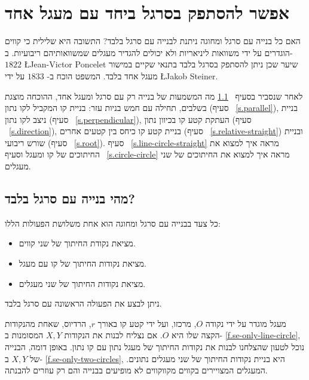 
\chapter{אפשר להסתפק בסרגל ביחד עם מעגל אחד}\label{c.straightedge}


האם כל בנייה עם סרגל ומחוגה ניתנת לבנייה עם סרגל בלבד? התשובה היא שלילית כי קווים הוגדרים על ידי משוואות ליניאריות ולא יכולים להגדיר מעגלים שמשוואותיהם ריבועיות. ב-%
$1822$
\L{Jean-Victor Poncelet}
שיער שכן ניתן להסתפק בסרגל בלבד בתנאי שקיים במישור מעגל אחד בלבד. המשפט הוכח ב-%
$1833$
על ידי
\L{Jakob Steiner}.

לאחר שנסביר בסעיף%
~\ref{s.se-what}
מה המשמעות של בנייה רק עם סרגל ומעגל אחד, ההוכחה מוצגת בשלבים, תחילה עם חמש בניות עזר: בניית קו המקביל לקו נתון (סעיף%
~\ref{s.parallel}),
בניית ניצב לקו נתון (סעיף%
~\ref{s.perpendicular}),
העתקת קטע קו בכיוון נתון (סעיף%
~\ref{s.direction}), 
בניית קטע קו כיחס בין קטעים אחרים (סעיף%
~\ref{s.relative-straight})
ובניית שורש ריבועי (סעיף%
~\ref{s.root}).
סעיף%
~\ref{s.line-circle-straight}
מראה איך למצוא את החיתוכים של קו ומעגל וסעיף%
~\ref{s.circle-circle}
מראה איך למצוא את החיתוכים של שני מעגלים.


\section{מהי בנייה עם סרגל בלבד?}\label{s.se-what}

כל צעד בבנייה עם סרגל ומחוגה הוא אחת משלושת הפעולות הללו:
\begin{itemize}
\setlength{\itemsep}{0pt}
\item
מציאת נקודת החיתוך של שני קווים.
\item
מציאת נקודות החיתוך של קו עם מעגל.
\item
מציאת נקודות החיתוך של שני מעגלים.
\end{itemize}
ניתן לבצע את הפעולה הראשונה עם סרגל בלבד.

מעגל מוגדר על ידי נקודה
$O$,
מרכזו, ועל ידי קטע קו באורך
$r$,
הרדיוס, שאחת מהנקודות הקצה שלו היא
$O$.
אם נצליח לבנות את הנקודות
$X,Y$
המסומנות ב-%
\ref{f.se-only-line-circle},
נוכל לטעון שהצלחנו לבנות את נקודות החיתוך של מעגל נתון עם קו נתון. באופן דומה, הבנייה של
$X,Y$
ב-%
\ref{f.se-only-two-circles},
היא בניית נקודות החיתוך של שני מעגלים נתונים. המעגלים המצויירים בקווים מקווקווים לא מופיעים בבנייה והם רק עוזרים להבנתה.

